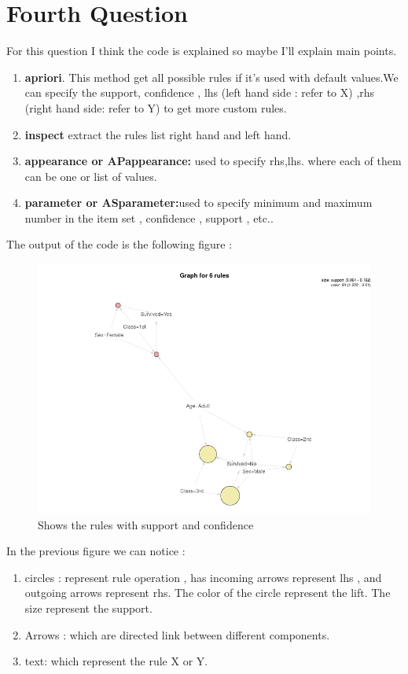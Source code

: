 \documentclass{article}
\begin{document}
	\section*{Fourth Question}
	For this question I think the code is explained so maybe I'll explain main points.
	\begin{enumerate}
		\item \textbf{apriori}.
		This method get all possible rules if it's used with default values.We can specify the support, confidence , lhs (left hand side : refer to X) ,rhs (right hand side: refer to Y) to get more custom rules.
		\item \textbf{inspect} extract the rules list right hand and left hand.
		\item \textbf{appearance or APappearance:} used to specify rhs,lhs. where each of them can be one or list of values.
		\item \textbf{parameter or ASparameter:}used to specify minimum and maximum number in the item set , confidence , support , etc..
	\end{enumerate}
	The output of the code is the following figure :
	\begin{figure}[H]
\includegraphics[scale=0.6]{rules.png}
\caption{Shows the rules with support and confidence}
	\end{figure}
	In the previous figure we can notice :
	\begin{enumerate}
\item circles : represent rule operation , has incoming arrows represent lhs , and outgoing arrows represent rhs. The color of the circle represent the lift. The size represent the support.
\item Arrows : which are directed link between different components.
\item text: which represent the rule X or Y.
	\end{enumerate}
\end{document}
